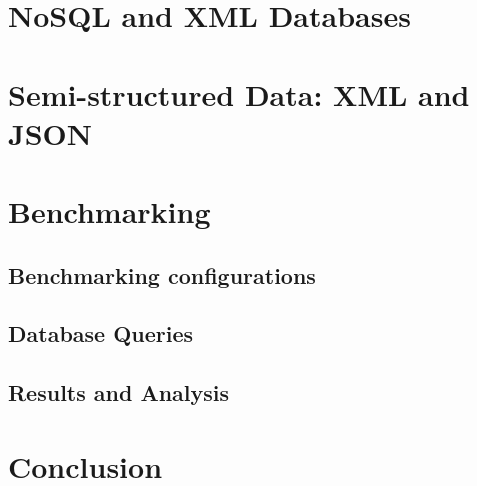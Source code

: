 \documentclass[a4paper,12pt]{book}
\begin{document}
	\chapter{NoSQL and XML Databases}\label{nosql-xml-database}
		
	\chapter{Semi-structured Data: XML and JSON}\label{semi-structure-data}
		
	\chapter{Benchmarking}\label{ch:benchmarking} %
	\section{Benchmarking configurations}
	
    \section{Database Queries}
        
    \section{Results and Analysis}
        
	\chapter{Conclusion}\label{conc} 
	    
\end{document}
